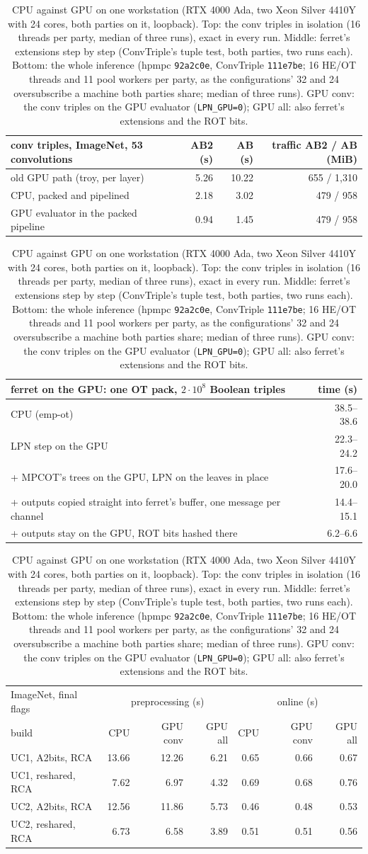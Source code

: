 \documentclass[10pt,a4paper]{article}
\begin{document}
\begin{table}[t]
\centering\small
\begin{tabular}{@{}lrrr@{}}
\toprule
conv triples, ImageNet, 53 convolutions & AB2 (s) & AB (s) & traffic AB2 / AB (MiB)\\
\midrule
old GPU path (troy, per layer) & 5.26 & 10.22 & 655 / 1{,}310\\
CPU, packed and pipelined & 2.18 & 3.02 & 479 / 958\\
GPU evaluator in the packed pipeline & 0.94 & 1.45 & 479 / 958\\
\bottomrule
\end{tabular}

\vspace{6pt}
\begin{tabular}{@{}lr@{}}
\toprule
ferret on the GPU: one OT pack, $2\cdot 10^8$ Boolean triples & time (s)\\
\midrule
CPU (emp-ot) & 38.5--38.6\\
LPN step on the GPU & 22.3--24.2\\
\quad + MPCOT's trees on the GPU, LPN on the leaves in place & 17.6--20.0\\
\quad + outputs copied straight into ferret's buffer, one message per channel & 14.4--15.1\\
\quad + outputs stay on the GPU, ROT bits hashed there & 6.2--6.6\\
\bottomrule
\end{tabular}

\vspace{6pt}
\begin{tabular}{@{}lrrrrrr@{}}
\toprule
ImageNet, final flags & \multicolumn{3}{c}{preprocessing (s)} & \multicolumn{3}{c}{online (s)}\\
build & CPU & GPU conv & GPU all & CPU & GPU conv & GPU all\\
\midrule
UC1, A2bits, RCA & 13.66 & 12.26 & 6.21 & 0.65 & 0.66 & 0.67\\
UC1, reshared, RCA & 7.62 & 6.97 & 4.32 & 0.69 & 0.68 & 0.76\\
UC2, A2bits, RCA & 12.56 & 11.86 & 5.73 & 0.46 & 0.48 & 0.53\\
UC2, reshared, RCA & 6.73 & 6.58 & 3.89 & 0.51 & 0.51 & 0.56\\
\bottomrule
\end{tabular}
\caption{CPU against GPU on one workstation (RTX 4000 Ada, two Xeon Silver 4410Y with 24 cores, both parties on it,
loopback). Top: the conv triples in isolation (16 threads per party, median of three runs), exact in every run. Middle:
ferret's extensions step by step (ConvTriple's tuple test, both parties, two runs each). Bottom: the whole inference
(hpmpc \texttt{92a2c0e}, ConvTriple \texttt{111e7be}; 16 HE/OT threads and 11 pool workers per party, as the
configurations' 32 and 24 oversubscribe a machine both parties share; median of three runs). GPU conv: the conv triples on
the GPU evaluator (\texttt{LPN\_GPU=0}); GPU all: also ferret's extensions and the ROT bits.}
\label{tab:gpu}
\end{table}
\end{document}

